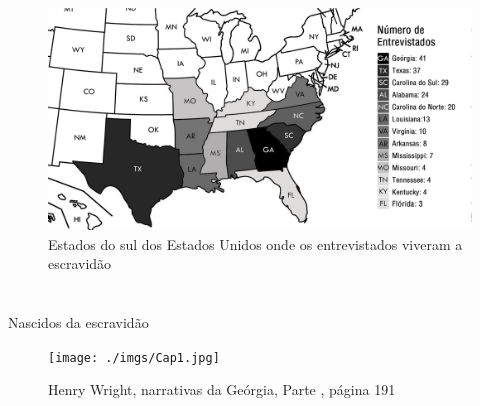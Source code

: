 
\movetoevenpage
\thispagestyle{empty}
\begin{absolutelynopagebreak}
\begin{vplace}
\begin{figure}[H]
\begin{adjustwidth}{-1.9cm}{}
  \centering
  \vspace*{4.25cm}
  \includegraphics[width=135mm]{./imgs/mapa.jpg}  
\end{adjustwidth}
  \caption{Estados do sul dos Estados Unidos onde os entrevistados viveram a escravidão}
\end{figure}
\end{vplace}

\end{absolutelynopagebreak}

\chapter*{}
\begin{center}
\begin{vplace}[0.3]
\Large
Nascidos da escravidão
\end{vplace}
\end{center}
\thispagestyle{empty}

\pagebreak
\thispagestyle{empty}

\begin{absolutelynopagebreak}
\begin{vplace}
\begin{figure}[H]
\begin{adjustwidth}{-1.8cm}{}
  \vspace*{-2cm}
  \texttt{[image: ./imgs/Cap1.jpg]}  
\end{adjustwidth}
  \caption{Henry Wright, narrativas da Geórgia, Parte , página 191}
\end{figure}
\end{vplace}

\end{absolutelynopagebreak}


